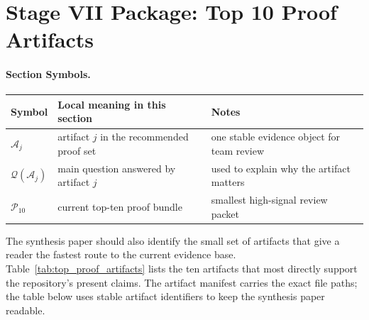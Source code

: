 \documentclass[11pt]{article}
\newcommand{\sectionsymbol}[3]{#1 & #2 & #3 \\}
\newcommand{\sectionsymbols}[1]{%
\begin{center}
\small
\setlength{\tabcolsep}{4pt}
\begin{tabularx}{0.95\textwidth}{>{\raggedright\arraybackslash}p{0.16\textwidth}X>{\raggedright\arraybackslash}p{0.18\textwidth}}
\toprule
Symbol & Local meaning in this section & Notes \\
\midrule
#1
\bottomrule
\end{tabularx}
\end{center}
}
\begin{document}
\section{Stage VII Package: Top 10 Proof Artifacts}
\paragraph{Section Symbols.}
\sectionsymbols{
\sectionsymbol{\(\mathcal{A}_j\)}{artifact \(j\) in the recommended proof set}{one stable evidence object for team review}
\sectionsymbol{\(\mathcal{Q}(\mathcal{A}_j)\)}{main question answered by artifact \(j\)}{used to explain why the artifact matters}
\sectionsymbol{\(\mathcal{P}_{10}\)}{current top-ten proof bundle}{smallest high-signal review packet}
}

\noindent
The synthesis paper should also identify the small set of artifacts that give a
reader the fastest route to the current evidence base. Table~\ref{tab:top_proof_artifacts}
lists the ten artifacts that most directly support the repository's present
claims. The artifact manifest carries the exact file paths; the table below uses
stable artifact identifiers to keep the synthesis paper readable.
\end{document}
